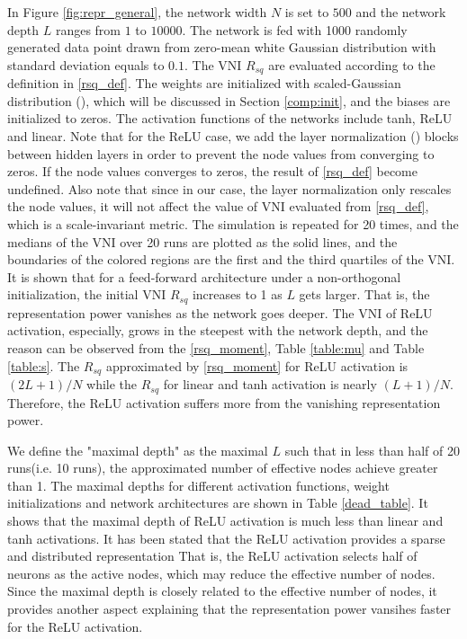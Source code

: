 In Figure \ref{fig:repr_general}, the network width $N$ is set to $500$ and the network depth
$L$ ranges from $1$ to $10000$. The network is fed with 1000 randomly generated data point
drawn from zero-mean white Gaussian distribution with standard deviation equals to $0.1$.
The VNI $R_{sq}$ are evaluated according to the definition in \eqref{rsq_def}.
The weights are initialized with scaled-Gaussian distribution (\cite{xavier, he}), which
will be discussed in Section \ref{comp:init}, and the biases are initialized to zeros.
The activation functions of the networks include tanh, ReLU and linear. Note that for the
ReLU case, we add the layer normalization (\cite{layer_norm}) blocks between hidden layers
in order to prevent the node values from converging to zeros. If the node values converges
to zeros, the result of \eqref{rsq_def} become undefined.
Also note that since in our case, the layer
normalization only rescales the node values, it will not affect the value of VNI evaluated
from \eqref{rsq_def}, which is a scale-invariant metric.
The simulation is repeated for 20 times, and the medians of the VNI over 20 runs are plotted as
the solid lines, and the boundaries of the colored regions are the first and the third
quartiles of the VNI. It is shown that for a feed-forward architecture under a non-orthogonal
initialization, the initial VNI $R_{sq}$ increases to 1 as $L$ gets larger. That is,
the representation power vanishes as the network goes deeper. The VNI of ReLU activation,
especially, grows in the steepest with the network depth, and the reason can be observed from
the \eqref{rsq_moment}, Table \ref{table:mu} and Table \ref{table:s}. The $R_{sq}$ 
approximated by \eqref{rsq_moment} for ReLU activation is $(2L+1)/N$ while the $R_{sq}$
for linear and tanh activation is nearly $(L+1)/N$.
Therefore, the ReLU activation suffers more from the vanishing representation power.

We define the "maximal depth" as the maximal $L$ such that in less than half of 20
runs(i.e. 10 runs), the approximated number of effective nodes achieve greater than 1.
The maximal depths for different activation functions, weight initializations and network
architectures are shown in Table \ref{dead_table}. It shows that the maximal depth of ReLU
activation is much less than linear and tanh activations. It has been stated
\cite{relu_sparse} that the ReLU activation provides a sparse and distributed representation
That is, the ReLU activation selects half of neurons as the active nodes, which may reduce the
effective number of nodes. Since the maximal depth is closely related to the effective number
of nodes, it provides another aspect explaining that the representation power vansihes
faster for the ReLU activation.


